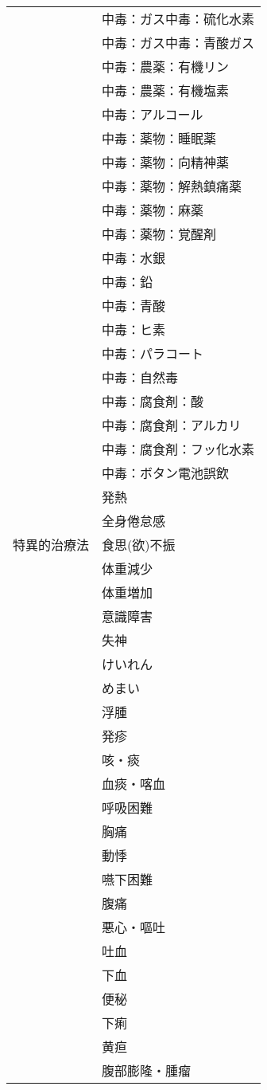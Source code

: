 \begin{xltabular}{\linewidth}{XX}
 & 中毒：ガス中毒：硫化水素 \\
 & 中毒：ガス中毒：青酸ガス \\
 & 中毒：農薬：有機リン \\
 & 中毒：農薬：有機塩素 \\
 & 中毒：アルコール \\
 & 中毒：薬物：睡眠薬 \\
 & 中毒：薬物：向精神薬 \\
 & 中毒：薬物：解熱鎮痛薬 \\
 & 中毒：薬物：麻薬 \\
 & 中毒：薬物：覚醒剤 \\
 & 中毒：水銀 \\
 & 中毒：鉛 \\
 & 中毒：青酸 \\
 & 中毒：ヒ素 \\
 & 中毒：パラコート \\
 & 中毒：自然毒 \\
 & 中毒：腐食剤：酸 \\
 & 中毒：腐食剤：アルカリ \\
 & 中毒：腐食剤：フッ化水素 \\
 & 中毒：ボタン電池誤飲  \\
 & 発熱 \\
 & 全身倦怠感 \\
特異的治療法 & 食思(欲)不振 \\
 & 体重減少 \\
 & 体重増加 \\
 & 意識障害 \\
 & 失神 \\
 & けいれん \\
 & めまい \\
 & 浮腫 \\
 & 発疹 \\
 & 咳・痰 \\
 & 血痰・喀血 \\
 & 呼吸困難 \\
 & 胸痛 \\
 & 動悸 \\
 & 嚥下困難 \\
 & 腹痛 \\
 & 悪心・嘔吐 \\
 & 吐血 \\
 & 下血 \\
 & 便秘 \\
 & 下痢 \\
 & 黄疸 \\
 & 腹部膨隆・腫瘤 \\

\end{xltabular}

